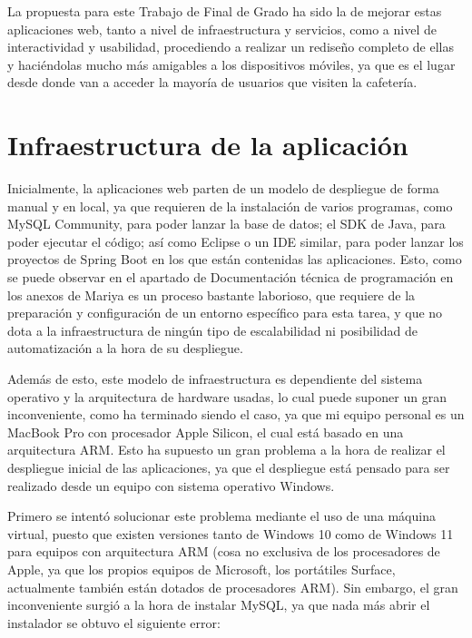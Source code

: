 La propuesta para este Trabajo de Final de Grado ha sido la de mejorar estas aplicaciones web, tanto a nivel de infraestructura y servicios, como a nivel de interactividad y usabilidad, procediendo a realizar un rediseño completo de ellas y haciéndolas mucho más amigables a los dispositivos móviles, ya que es el lugar desde donde van a acceder la mayoría de usuarios que visiten la cafetería.

\section{Infraestructura de la aplicación}

Inicialmente, la aplicaciones web parten de un modelo de despliegue de forma manual y en local, ya que requieren de la instalación de varios programas, como MySQL Community, para poder lanzar la base de datos; el SDK de Java, para poder ejecutar el código; así como Eclipse o un IDE similar, para poder lanzar los proyectos de Spring Boot en los que están contenidas las aplicaciones. Esto, como se puede observar en el apartado de Documentación técnica de programación en los anexos de Mariya \cite{tfg-mariya:anexos} es un proceso bastante laborioso, que requiere de la preparación y configuración de un entorno específico para esta tarea, y que no dota a la infraestructura de ningún tipo de escalabilidad ni posibilidad de automatización a la hora de su despliegue.

Además de esto, este modelo de infraestructura es dependiente del sistema operativo y la arquitectura de hardware usadas, lo cual puede suponer un gran inconveniente, como ha terminado siendo el caso, ya que mi equipo personal es un MacBook Pro con procesador Apple Silicon, el cual está basado en una arquitectura ARM. Esto ha supuesto un gran problema a la hora de realizar el despliegue inicial de las aplicaciones, ya que el despliegue está pensado para ser realizado desde un equipo con sistema operativo Windows. 

Primero se intentó solucionar este problema mediante el uso de una máquina virtual, puesto que existen versiones tanto de Windows 10 como de Windows 11 para equipos con arquitectura ARM (cosa no exclusiva de los procesadores de Apple, ya que los propios equipos de Microsoft, los portátiles Surface, actualmente también están dotados de procesadores ARM). Sin embargo, el gran inconveniente surgió a la hora de instalar MySQL, ya que nada más abrir el instalador se obtuvo el siguiente error:


